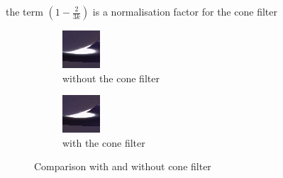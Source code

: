 the term $(1 - \frac{2}{3k})$ is a normalisation factor for the cone filter \cite{Foley97}


\begin{figure}[h]

\centering
\begin{subfigure}[b]{0.4\textwidth}
	\includegraphics[width=\textwidth]{./images/renders/no-filter.png}
	\caption{without the cone filter}
\end{subfigure}
\begin{subfigure}[b]{0.4\textwidth}
	\includegraphics[width=\textwidth]{./images/renders/filter.png}
	\caption{with the cone filter}
\end{subfigure}
\caption{Comparison with and without cone filter}

\end{figure}
